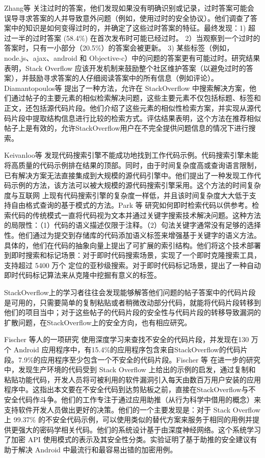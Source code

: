 Zhang等 \cite{obsolete_answer} 关注过时的答案，他们发现如果没有明确识别或记录，过时答案可能会误导寻求答案的人并导致意外问题（例如，使用过时的安全协议）。他们调查了答案中的知识是如何变得过时的，并确定了这些过时答案的特征。最终发现：1) 超过一半的过时答案 (58.4\%) 在首次发布时可能已经过时。 2）当观察到一个过时的答案时，只有一小部分（20.5\%）的答案会被更新。 3) 某些标签（例如，node.js、ajax、android 和 Objective-c）中的问题的答案更有可能过时。研究结果表明，Stack Overflow 应该开发机制来鼓励整个社区维护答案（以避免过时的答案），并鼓励寻求答案的人仔细阅读答案中的所有信息（例如评论）。Diamantopoulos等 \cite{data1} 提出了一种方法，允许在 StackOverflow 中搜索解决方案，他们通过帖子的主要元素的相似检索解决问题，这些主要元素不仅包括标题、标签和正文，还包括源代码片段。他们介绍了这些元素的相似性检索方案，并实现从源代码片段中提取结构信息进行比较的检索方式。评估结果表明，这个方法在推荐相似帖子上是有效的，允许StackOverflow用户在不完全提供问题信息的情况下进行搜索。

Keivanloo等 \cite{data2} 发现代码搜索引擎不能成功地找到工作代码示例。代码搜索引擎未能将高质量的代码示例排在结果的顶部。同时，由于时间复杂度高或查询语言限制，已有解决方案无法直接集成到大规模的源代码引擎中。他们提出了一种发现工作代码示例的方法，该方法可以被大规模的源代码搜索引擎采用。这个方法的时间复杂度与互联网 上现有代码搜索引擎的复杂度一样低，并且该时间复杂度大大低于支持自由格式查询的基于模式的方法。Park 等 \cite{data3} 研究如何即时检索代码以供参考。检索代码的传统模式一直将代码视为文本并通过关键字搜索技术解决问题。这种方法的局限性：（1）代码的语义描述仅限于注释。（2）句法关键字通常没有足够的选择性。他们通过为提交到存储库的代码添加语义标签来增强基于关键字的语义方法。具体的，他们在代码的抽象向量上提出了可扩展的索引结构。他们将这个技术部署到即时搜索和标记场景：对于即时代码搜索场景，实现了一个即时克隆搜索工具，支持超过 5400 万个 
定位的亚秒级搜索。对于即时代码标记场景，提出了一种自动即时代码标记算法来从克隆中挖掘有意义的标签。

StackOverflow上的学习者往往会发现能够解答他们问题的帖子答案中的代码片段是可用的，只需要简单的复制粘贴或者稍微改动部分代码，就能将代码片段转移到他们的项目当中；对于这些帖子的代码片段的安全性与代码片段的转移导致漏洞的扩散问题，在StackOverflow上的安全方向，也有相应研究。

Fischer 等人的一项研究\cite{fisher1} 使用深度学习来查找不安全的代码片段，并发现在130 万个 Android 应用程序中，有15.4\%的应用程序包含来自StackOverflow的代码片段。7.9\%的应用程序至少包含一个不安全的代码片段。Fischer 等 \cite{fischer2} 在进一步的研究中，发现生产环境的代码受到 Stack Overflow 上给出的示例的启发，通过复制和粘贴功能代码，开发人员将可被利用的软件漏洞引入每天由数百万用户安装的应用程序中。这指出本文要在不安全代码到达剪贴板之前，直接在StackOverflow与不安全代码作斗争。他们的工作专注于通过应用助推（从行为科学中借用的概念）来支持软件开发人员做出更好的决策。他们的一个主要发现是：对于 Stack Overflow 上 99.37\% 的不安全代码示例，可以使用类似的替代方案来服务于相同的用例并提供更强大的密码学相关代码。他们的系统设计基于由深度神经网络。这个系统学习了加密 API 使用模式的表示及其安全性分类。实验证明了基于助推的安全建议有助于解决 Android 中最流行和最容易出错的加密用例。

